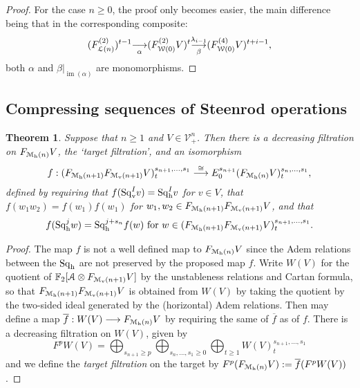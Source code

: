 \documentclass[11pt]{amsart}
\theoremstyle{plain}
\newtheorem{thm}{Theorem}[section]
\theoremstyle{definition}
\DeclareMathOperator{\im}{im}
\renewcommand{\to}{\longrightarrow}
\newcommand{\calW}{\mathcal{W}}
\newcommand{\calA}{\mathcal{A}}
\newcommand{\calV}{\mathcal{V}}
\newcommand{\call}{\mathcal{L}}
\newcommand{\calMv}{\mathcal{M}_\textup{v}}
\newcommand{\calMh}{\mathcal{M}_\textup{h}}
\theoremstyle{plain}
\newcommand{\vect}[2]{\calV^{#1}_{#2}}
\newcommand{\mono}{{\to}}
\newcommand{\Sqh}{\mathrm{Sq}_\textup{h}}
\newcommand{\Sqv}{\mathrm{Sq}_\textup{v}}
\newcommand{\LieSteen}{\calA}
\newcommand{\F}{\mathbb{F}}
\begin{document}
\begin{Cohomology Operations for W and U}
\begin{proof}
For the case $n\geq0$, the proof only becomes easier, the main difference being that in the corresponding composite:
\[(F_{\call(n)}^{(2)})^{t-1}\underset{\smash{\alpha}}{{\to}} (F^{(2)}_{\calW(0)}V)^{t}\underset{\smash{\beta}}{\overset{\lambda_{i-1}}{\mono}} (F^{(4)}_{\calW(0)}V)^{t+i-1},\]
both $\alpha$ and $\beta|_{\im(\alpha)}$ are monomorphisms.
\end{proof}

\subsection{Compressing sequences of Steenrod operations}
\begin{thm}\label{thm on compressing seqs of steenrod ops}
Suppose that $n\geq1$ and $V\in \vect{n}{+}$. Then there is a decreasing filtration on $F_{\calMh(n)}V$, the `target filtration', and an isomorphism
\[ f:(F_{\calMh(n+1)}F_{\calMv(n+1)}V)^{s_{n+1},\ldots,s_1}_t\overset{\cong}{\to} E_0^{s_{n+1}}(F_{\calMh(n)}V)^{s_n,\ldots,s_1}_t,\]
defined by requiring that
$f(\Sqv^Iv)=\Sqh^Iv$ for $v\in V$, that $f(w_1w_2)=f(w_1)f(w_1)$ for $w_1,w_2\in F_{\calMh(n+1)}F_{\calMv(n+1)}V$,
and that
\[f(\Sqh^jw)=\Sqh^{j+s_n}f(w)\textup{ for }w\in (F_{\calMh(n+1)}F_{\calMv(n+1)}V)^{s_{n+1},\ldots,s_1}_t.\]
\end{thm}
\begin{proof}
The map $f$ is not a well defined map to $F_{\calMh(n)}V$ since the Adem relations between the $\Sqh$ are not preserved by the proposed map $f$. Write $W(V)$ for the quotient of $\F_2[\LieSteen\otimes F_{\calMv(n+1)}V]$ by the unstableness relations and Cartan formula, so that $F_{\calMh(n+1)}F_{\calMv(n+1)}V$ is obtained from $W(V)$ by taking the quotient by the two-sided ideal generated by the (horizontal) Adem relations. Then may define a map $\overline{f}:W(V)\to F_{\calMh(n)}V$ by requiring the same of $\overline{f}$ as of $f$. There is a decreasing filtration on $W(V)$, given by 
\[F^pW(V)=\bigoplus_{s_{n+1}\geq p}\bigoplus_{s_n,\ldots,s_1\geq0}\bigoplus_{t\geq1}W(V)^{s_{n+1},\ldots,s_1}_t\]
 and we define the \emph{target filtration} on the target by $F^p(F_{\calMh(n)}V):=\overline{f}(F^pW(V))$.


\end{proof}
\end{Cohomology Operations for W and U}
\end{document}
